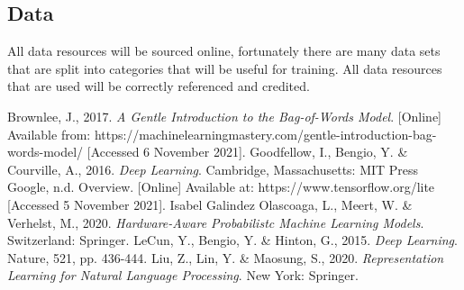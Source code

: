 \documentclass{article}
\begin{document}
\subsection{Data}
All data resources will be sourced online, fortunately there are many data sets that are split into categories that will be useful for training. All data resources that are used will be correctly referenced and credited.
\begin{thebibliography}{1}
Brownlee, J., 2017. \textit{A Gentle Introduction to the Bag-of-Words Model}. [Online] Available from: https://machinelearningmastery.com/gentle-introduction-bag-words-model/ [Accessed 6 November 2021].
Goodfellow, I., Bengio, Y. \& Courville, A., 2016. \textit{Deep Learning}. Cambridge, Massachusetts: MIT Press
Google, n.d. Overview. [Online] Available at: https://www.tensorflow.org/lite [Accessed 5 November 2021].
Isabel Galindez Olascoaga, L., Meert, W. \& Verhelst, M., 2020. \textit{Hardware-Aware Probabilistc Machine Learning Models}. Switzerland: Springer.
LeCun, Y., Bengio, Y. \& Hinton, G., 2015. \textit{Deep Learning}. Nature, 521, pp. 436-444.
Liu, Z., Lin, Y. \& Maosung, S., 2020. \textit{Representation Learning for Natural Language Processing}. New York: Springer.
\end{thebibliography}
\end{document}
